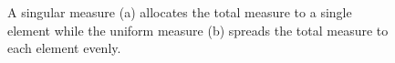 \documentclass[
  letterpaper,
  DIV=11,
  numbers=noendperiod]{scrartcl}
\begin{document}
\begin{figure}

\begin{minipage}[t]{0.50\linewidth}

{\centering 


}

\subcaption{\label{fig-types_of_measurea}}
\end{minipage}%
%
\begin{minipage}[t]{0.50\linewidth}

{\centering 


}

\subcaption{\label{fig-types_of_measureb}}
\end{minipage}%

\caption{\label{fig-types_of_measure}A singular measure (a) allocates
the total measure to a single element while the uniform measure (b)
spreads the total measure to each element evenly.}

\end{figure}
\end{document}
